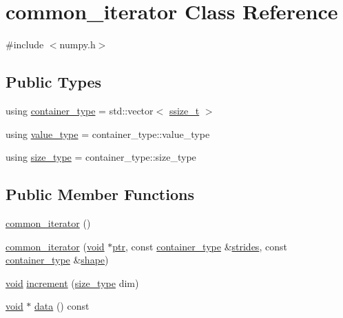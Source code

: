 \hypertarget{classcommon__iterator}{}\section{common\+\_\+iterator Class Reference}
\label{classcommon__iterator}


{\ttfamily \#include $<$numpy.\+h$>$}

\subsection*{Public Types}
\begin{DoxyCompactItemize}
\item 
using \mbox{\hyperlink{classcommon__iterator_a61d77b64fb74c43f016ce8cbde4b27c7}{container\+\_\+type}} = std\+::vector$<$ \mbox{\hyperlink{detail_2common_8h_ac430d16fc097b3bf0a7469cfd09decda}{ssize\+\_\+t}} $>$
\item 
using \mbox{\hyperlink{classcommon__iterator_ae5c71809ed30d20b321bf01f4043142e}{value\+\_\+type}} = container\+\_\+type\+::value\+\_\+type
\item 
using \mbox{\hyperlink{classcommon__iterator_a1b9c8bc2b0275b8b9b6f5410b6f96148}{size\+\_\+type}} = container\+\_\+type\+::size\+\_\+type
\end{DoxyCompactItemize}
\subsection*{Public Member Functions}
\begin{DoxyCompactItemize}
\item 
\mbox{\hyperlink{classcommon__iterator_a7e2266ddbeb3adb5d1cad2854cba952f}{common\+\_\+iterator}} ()
\item 
\mbox{\hyperlink{classcommon__iterator_a5bb0f4465ff31b46f77188fe253ade67}{common\+\_\+iterator}} (\mbox{\hyperlink{_s_d_l__opengles2__gl2ext_8h_ae5d8fa23ad07c48bb609509eae494c95}{void}} $\ast$\mbox{\hyperlink{pystrtod_8h_a671b2e1a427060ad8b5362882ed58f5b}{ptr}}, const \mbox{\hyperlink{classcommon__iterator_a61d77b64fb74c43f016ce8cbde4b27c7}{container\+\_\+type}} \&\mbox{\hyperlink{_s_d_l__opengl__glext_8h_a0ee97b40d6208eba611c597d83b029a5}{strides}}, const \mbox{\hyperlink{classcommon__iterator_a61d77b64fb74c43f016ce8cbde4b27c7}{container\+\_\+type}} \&\mbox{\hyperlink{abstract_8h_aa30a150670a6aaebe0bf9bcf91b00b35}{shape}})
\item 
\mbox{\hyperlink{_s_d_l__opengles2__gl2ext_8h_ae5d8fa23ad07c48bb609509eae494c95}{void}} \mbox{\hyperlink{classcommon__iterator_a6f54104a4b0847b87bab424db09b85d7}{increment}} (\mbox{\hyperlink{classcommon__iterator_a1b9c8bc2b0275b8b9b6f5410b6f96148}{size\+\_\+type}} dim)
\item 
\mbox{\hyperlink{_s_d_l__opengles2__gl2ext_8h_ae5d8fa23ad07c48bb609509eae494c95}{void}} $\ast$ \mbox{\hyperlink{classcommon__iterator_a29db8ccd525c10275c1cbcab64c56b95}{data}} () const
\end{DoxyCompactItemize}



